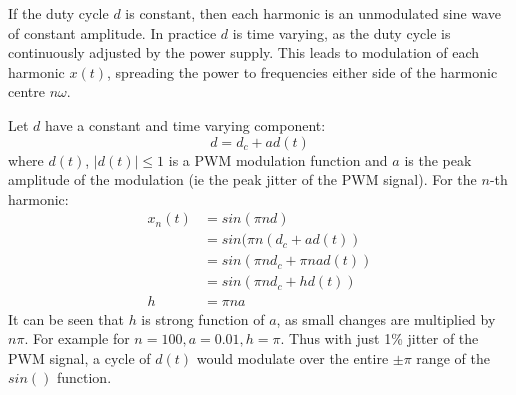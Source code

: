 \documentclass{article}
\begin{document}
If the duty cycle $d$ is constant, then each harmonic is an unmodulated sine wave of constant amplitude. In practice $d$ is time varying, as the duty cycle is continuously adjusted by the power supply.  This leads to modulation of each harmonic $x(t)$, spreading the power to frequencies either side of the harmonic centre $n \omega$.

Let $d$ have a constant and time varying component:
\begin{equation}
d=d_c+ad(t)
\end{equation}
where $d(t)$, $|d(t)| \le 1$ is a PWM modulation function and $a$ is the peak amplitude of the modulation (ie the peak jitter of the PWM signal). For the $n$-th harmonic:
\begin{equation} \label{eq:pwm_n}
\begin{split}
x_n(t) &= sin(\pi n d) \\
       &= sin(\pi n (d_c+ad(t)) \\
       &= sin(\pi n d_c + \pi n a d(t)) \\
       &= sin(\pi n d_c + h d(t))  \\
     h &= \pi n a
\end{split}
\end{equation}
It can be seen that $h$ is strong function of $a$, as small changes are multiplied by $n \pi$. For example for $n=100, a=0.01, h = \pi$.  Thus with just 1\% jitter of the PWM signal, a cycle of $d(t)$ would modulate over the entire $\pm \pi$ range of the $sin()$ function.
\end{document}
